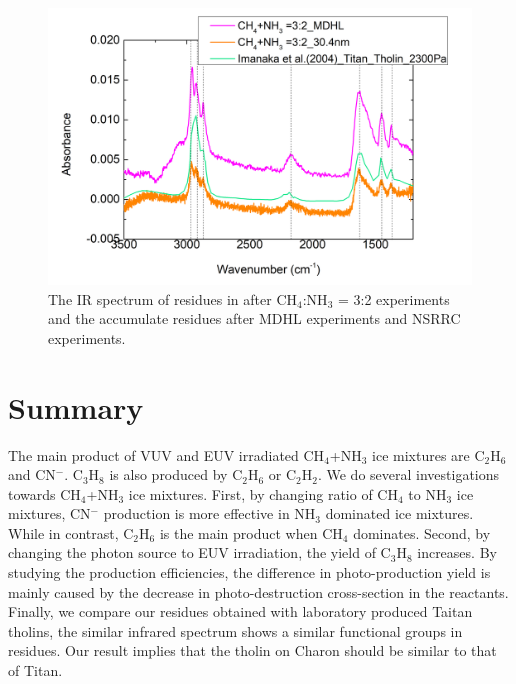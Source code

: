\begin{figure}
\centering
\includegraphics[width=\textwidth]{figures/chapter3/residue.png}
\caption{The IR spectrum of residues in after CH$_4$:NH$_3$ = 3:2 experiments and the accumulate residues after MDHL experiments and NSRRC experiments.}
\label{fig:residues}
\end{figure}


\section{Summary} %

The main product of VUV and EUV irradiated CH$_4$+NH$_3$ ice mixtures are C$_2$H$_6$ and CN$^-$. C$_3$H$_8$ is also produced by C$_2$H$_6$ or C$_2$H$_2$. We do several investigations towards CH$_4$+NH$_3$ ice mixtures. First, by changing ratio of CH$_4$ to NH$_3$ ice mixtures, CN$^-$ production is more effective in NH$_3$ dominated ice mixtures. While in contrast, C$_2$H$_6$ is the main product when CH$_4$ dominates. Second, by changing the photon source to EUV irradiation, the yield of C$_3$H$_8$ increases. By studying the production efficiencies, the difference in photo-production yield is mainly caused by the decrease in photo-destruction cross-section in the reactants. Finally, we compare our residues obtained with laboratory produced Taitan tholins, the similar infrared spectrum shows a similar functional groups in residues. Our result implies that the tholin on Charon should be similar to that of Titan.


